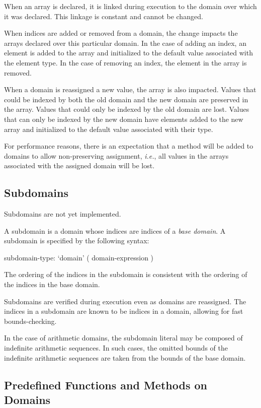 When an array is declared, it is linked during execution to the domain
over which it was declared.  This linkage is constant and cannot be
changed.

When indices are added or removed from a domain, the change impacts
the arrays declared over this particular domain.  In the case of
adding an index, an element is added to the array and initialized to
the default value associated with the element type.  In the case of
removing an index, the element in the array is removed.

When a domain is reassigned a new value, the array is also impacted.
Values that could be indexed by both the old domain and the new domain
are preserved in the array.  Values that could only be indexed by the
old domain are lost.  Values that can only be indexed by the new
domain have elements added to the new array and initialized to the
default value associated with their type.

For performance reasons, there is an expectation that a method will be
added to domains to allow non-preserving assignment, {\em i.e.}, all
values in the arrays associated with the assigned domain will be lost.

\subsection{Subdomains}
\label{Subdomains}

\begin{implementation}
Subdomains are not yet implemented.
\end{implementation}

A subdomain is a domain whose indices are indices of a {\em base
  domain}.  A subdomain is specified by the following syntax:
\begin{syntax}
subdomain-type:
  `domain' ( domain-expression )
\end{syntax}
The ordering of the indices in the subdomain is consistent with the
ordering of the indices in the base domain.

Subdomains are verified during execution even as domains are
reassigned.  The indices in a subdomain are known to be indices in a
domain, allowing for fast bounds-checking.

In the case of arithmetic domains, the subdomain literal may be
composed of indefinite arithmetic sequences.  In such cases, the
omitted bounds of the indefinite arithmetic sequences are taken from
the bounds of the base domain.

\subsection{Predefined Functions and Methods on Domains}

